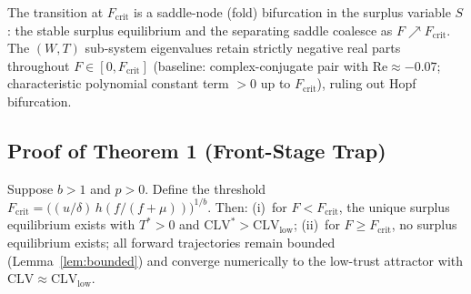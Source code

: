 \documentclass[msom,dblanonrev]{informs4}
\begin{document}
\begin{remark}\label{rem:bifurcation}
The transition at $F_{\mathrm{crit}}$ is a saddle-node (fold) bifurcation in the surplus variable $S$: the stable surplus equilibrium and the separating saddle coalesce as $F \nearrow F_{\mathrm{crit}}$. The $(W,T)$ sub-system eigenvalues retain strictly negative real parts throughout $F \in [0, F_{\mathrm{crit}}]$ (baseline: complex-conjugate pair with $\mathrm{Re} \approx -0.07$; characteristic polynomial constant term $>0$ up to $F_{\mathrm{crit}}$), ruling out Hopf bifurcation.
\end{remark}

\subsection{Proof of Theorem 1 (Front-Stage Trap)}\label{sec:ec:proof1}

\begin{theorem}
Suppose $b > 1$ and $p > 0$. Define the threshold $F_{\mathrm{crit}} = \bigl((u/\delta)\,h(f/(f+\mu))\bigr)^{1/b}$. Then: (i)~for $F < F_{\mathrm{crit}}$, the unique surplus equilibrium exists with $T^* > 0$ and $\mathrm{CLV}^* > \mathrm{CLV}_{\mathrm{low}}$; (ii)~for $F \geq F_{\mathrm{crit}}$, no surplus equilibrium exists; all forward trajectories remain bounded (Lemma~\ref{lem:bounded}) and converge numerically to the low-trust attractor with $\mathrm{CLV} \approx \mathrm{CLV}_{\mathrm{low}}$.
\end{theorem}
\end{document}
